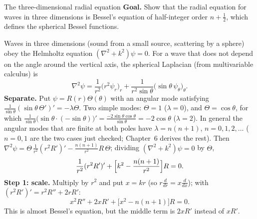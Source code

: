 \documentclass[11pt]{beamer}
\begin{document}
\begin{frame}[allowframebreaks=1.00]{The three-dimensional radial equation}
\footnotesize
\textbf{Goal.} Show that the radial equation for waves in three dimensions is Bessel's
equation of half-integer order $n+\tfrac12$, which defines the spherical Bessel functions.

Waves in three dimensions (sound from a small source, scattering by a sphere) obey the
Helmholtz equation $(\nabla^2+k^2)\psi=0$. For a wave that does not depend on the angle around the
vertical axis, the spherical Laplacian (from multivariable calculus) is
\[
 \nabla^2\psi=\frac1{r^2}\bigl(r^2\psi_r\bigr)_r+\frac1{r^2\sin\theta}\bigl(\sin\theta\,\psi_\theta\bigr)_\theta .
\]
\textbf{Separate.} Put \(\psi=R(r)\Theta(\theta)\) with an angular mode satisfying
\(\frac1{\sin\theta}(\sin\theta\,\Theta')'=-\lambda\Theta\). Two simple modes: \(\Theta=1\) (\(\lambda=0\)), and \(\Theta=\cos\theta\), for which
\(\frac1{\sin\theta}\bigl(\sin\theta\cdot(-\sin\theta)\bigr)'=\frac{-2\sin\theta\cos\theta}{\sin\theta}=-2\cos\theta\) (\(\lambda=2\)). In general the angular modes that are
finite at both poles have \(\lambda=n(n+1)\), \(n=0,1,2,\dots\) (\(n=0,1\) are the two cases just
checked; Chapter~6 derives the rest). Then \(\nabla^2\psi=\Theta\,\frac1{r^2}(r^2R')'-\frac{n(n+1)}{r^2}R\,\Theta\); dividing
\((\nabla^2+k^2)\psi=0\) by \(\Theta\),
\[
 \frac1{r^2}(r^2R')'+\Bigl[k^2-\frac{n(n+1)}{r^2}\Bigr]R=0.
\]
\textbf{Step 1: scale.} Multiply by \(r^2\) and put \(x=kr\) (so \(r\frac{d}{dr}=x\frac{d}{dx}\)); with
\((r^2R')'=r^2R''+2rR'\):
\[
 x^2R''+2xR'+\bigl[x^2-n(n+1)\bigr]R=0.
\]
This is almost Bessel's equation, but the middle term is \(2xR'\) instead of \(xR'\).


\end{frame}
\end{document}
